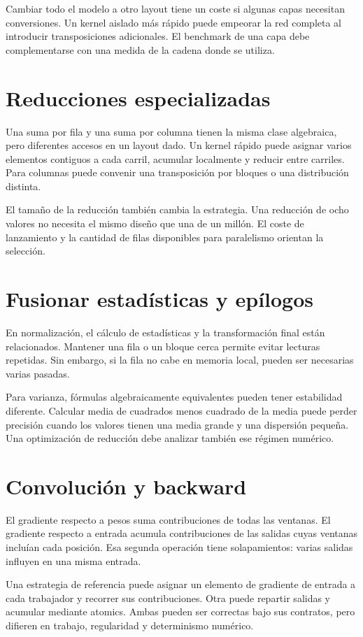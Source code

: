 \documentclass[12pt,a4paper,oneside]{report}
\begin{document}
Cambiar todo el modelo a otro layout tiene un coste si algunas capas necesitan conversiones. Un kernel aislado más rápido puede empeorar la red completa al introducir transposiciones adicionales. El benchmark de una capa debe complementarse con una medida de la cadena donde se utiliza.

\section{Reducciones especializadas}
Una suma por fila y una suma por columna tienen la misma clase algebraica, pero diferentes accesos en un layout dado. Un kernel rápido puede asignar varios elementos contiguos a cada carril, acumular localmente y reducir entre carriles. Para columnas puede convenir una transposición por bloques o una distribución distinta.

El tamaño de la reducción también cambia la estrategia. Una reducción de ocho valores no necesita el mismo diseño que una de un millón. El coste de lanzamiento y la cantidad de filas disponibles para paralelismo orientan la selección.

\section{Fusionar estadísticas y epílogos}
En normalización, el cálculo de estadísticas y la transformación final están relacionados. Mantener una fila o un bloque cerca permite evitar lecturas repetidas. Sin embargo, si la fila no cabe en memoria local, pueden ser necesarias varias pasadas.

Para varianza, fórmulas algebraicamente equivalentes pueden tener estabilidad diferente. Calcular media de cuadrados menos cuadrado de la media puede perder precisión cuando los valores tienen una media grande y una dispersión pequeña. Una optimización de reducción debe analizar también ese régimen numérico.

\section{Convolución y backward}
El gradiente respecto a pesos suma contribuciones de todas las ventanas. El gradiente respecto a entrada acumula contribuciones de las salidas cuyas ventanas incluían cada posición. Esa segunda operación tiene solapamientos: varias salidas influyen en una misma entrada.

Una estrategia de referencia puede asignar un elemento de gradiente de entrada a cada trabajador y recorrer sus contribuciones. Otra puede repartir salidas y acumular mediante atomics. Ambas pueden ser correctas bajo sus contratos, pero difieren en trabajo, regularidad y determinismo numérico.
\end{document}

